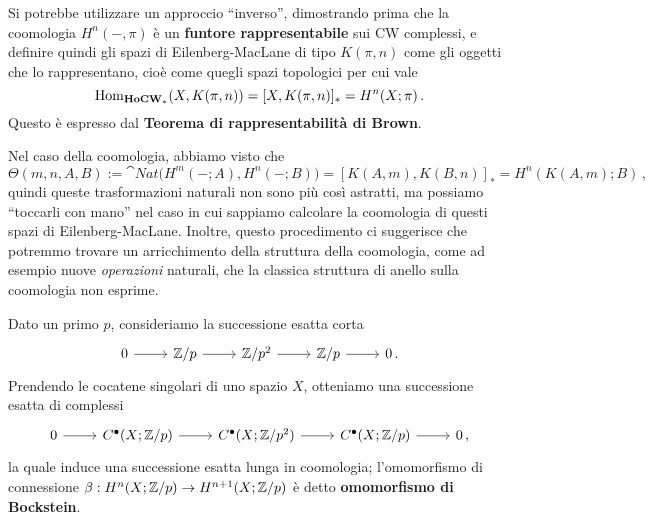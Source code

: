 \begin{fact}
Si potrebbe utilizzare un approccio ``inverso'',
dimostrando prima che la coomologia $H^{n}(-,\pi)$
è un \textbf{funtore rappresentabile} sui CW complessi,
e definire quindi gli spazi di Eilenberg-MacLane di tipo
$K(\pi,n)$ come gli oggetti che lo rappresentano,
cioè come quegli spazi topologici per cui vale
\begin{equation*}
	\operatorname{Hom}_{{\normalfont\textbf{HoCW}}_{\ast}}(X,K(\pi,n)) = [X,K(\pi,n)]_{\ast} = H^{n}(X;\pi)\,.
\end{equation*}
Questo è espresso dal \textbf{Teorema di rappresentabilità di Brown}.
\end{fact}

Nel caso della coomologia, abbiamo visto che
\begin{equation*}
	\Theta(m,n,A,B) := \cat{Nat}\Big(H^{m}(-;A), H^{n}(-;B) \Big)
	= [K(A,m),K(B,n)]_{\ast} = H^{n}(K(A,m);B)\,,
\end{equation*}
quindi queste trasformazioni naturali non sono più
così astratti, ma possiamo ``toccarli con mano'' nel caso in
cui sappiamo calcolare la coomologia di questi spazi di Eilenberg-MacLane.
Inoltre, questo procedimento ci suggerisce che
potremmo trovare un arricchimento della struttura
della coomologia, come ad esempio nuove \emph{operazioni}
naturali, che la classica struttura di anello sulla coomologia
non esprime.

\begin{ex}
	Dato un primo $p$, consideriamo la successione esatta corta
	\begin{equation*}
		\begin{tikzcd}
			0 \ar[r]
			& \Z/p \ar[r]
			& \Z/p^{2} \ar[r]
			& \Z/p \ar[r]
			& 0\,.
		\end{tikzcd}
	\end{equation*}
	Prendendo le cocatene singolari di uno spazio $X$,
	otteniamo una successione esatta di complessi
	\begin{equation*}
		\begin{tikzcd}
			0 \ar[r]
			& C^{\bullet}(X;\Z/p) \ar[r]
			& C^{\bullet}(X;\Z/p^{2}) \ar[r]
			& C^{\bullet}(X;\Z/p) \ar[r]
			& 0\,,
		\end{tikzcd}
	\end{equation*}
	la quale induce una successione esatta lunga in coomologia;
	l'omomorfismo di connessione $\beta:H^{n}(X;{\mathbb Z}/p) \to H^{n+1}(X;{\mathbb Z}/p)$
	è detto \textbf{omomorfismo di Bockstein}.
\end{ex}

